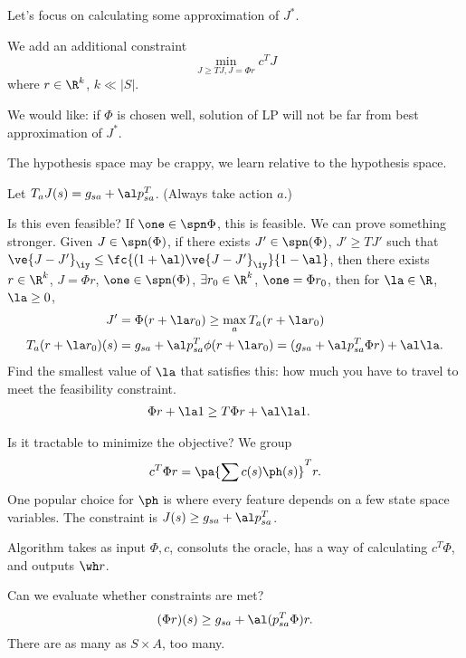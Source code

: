Let's focus on calculating some approximation of $J^*$. 

We add an additional constraint
$$
\min_{J\ge TJ, J=\Phi r} c^TJ
$$
where $r\in \R^k$, $k\ll |S|$.

We would like: if $\Phi$ is chosen well, %
solution of LP will not be far from best approximation of $J^*$.


The hypothesis space may be crappy, we learn relative to the hypothesis space.

Let $T_aJ(s) = g_{sa} + \al p_{sa}^T$. (Always take action $a$.)

Is this even feasible? If $\one\in \spn \Phi$, this is feasible. We can prove something stronger. Given $J\in \spn(\Phi)$, if there exists $J'\in \spn(\Phi)$, $J'\ge TJ'$ such that $\ve{J-J'}_\iy\le \fc{(1+\al)\ve{J-J'}_\iy}{1-\al}$, then there exists $r\in \R^k$, $J=\Phi r$, $\one \in \spn (\Phi)$, $\exists r_0\in \R^k$, $\one = \Phi r_0$, then for $\la \in \R$, $\la\ge 0$,
\begin{align}
J'&=\Phi(r+\la r_0) \ge \max_a T_a(r+\la r_0)\\
T_a(r+\la r_0)(s) &= g_{sa} + \al p_{sa}^T \phi(r+\la r_0) = (g_{sa}+\al p_{sa}^T \Phi r)+ \al \la.
\end{align}
Find the smallest value of $\la$ that satisfies this: how much you have to travel to meet the feasibility constraint. 
\begin{align}
\Phi r + \la 1 & \ge T \Phi r + \al \la 1.
\end{align}

Is it tractable to minimize the objective? We group
$$
c^T\Phi r= \pa{\sum c(s) \ph(s)}^Tr.
$$
One popular choice for $\ph$ is where every feature depends on a few state space variables. 
The constraint is $J(s) \ge g_{sa} + \al p_{sa}^T$. 

Algorithm takes as input $\Phi, c$, consoluts the oracle, has a way of calculating $c^T\Phi$, and outputs $\wh r$.

Can we evaluate whether constraints are met? 
$$
(\Phi r)(s) \ge g_{sa} + \al (p_{sa}^T \Phi)r.
$$
There are as many as $S\times A$, too many.

